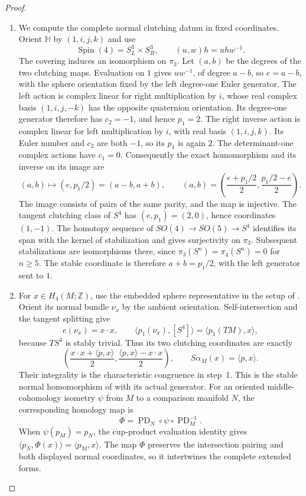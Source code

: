 \begin{proof}
\begin{enumerate}[label=\arabic*.]
\item We compute the complete normal clutching datum in fixed
coordinates. Orient $\mathbb H$ by $(1,i,j,k)$ and use
\[
\operatorname{Spin}(4)=S^3_L\times S^3_R,
\qquad (u,w)h=uhw^{-1}.
\]
The covering induces an isomorphism on $\pi_3$. Let $(a,b)$ be
the degrees of the two clutching maps. Evaluation on $1$ gives
$uw^{-1}$, of degree $a-b$, so $e=a-b$, with the sphere orientation
fixed by the left degree-one Euler generator. The left action is
complex linear for right multiplication by $i$, whose real complex
basis $(1,i,j,-k)$ has the opposite quaternion orientation. Its
degree-one generator therefore has $c_2=-1$, and hence $p_1=2$.
The right inverse action is complex linear for left multiplication
by $i$, with real basis $(1,i,j,k)$. Its Euler number and $c_2$ are
both $-1$, so its $p_1$ is again $2$. The determinant-one complex
actions have $c_1=0$. Consequently the exact homomorphism and its
inverse on its image are
\[
(a,b)\longmapsto(e,p_1/2)=(a-b,a+b),
\qquad
(a,b)=\left(\frac{e+p_1/2}{2},\frac{p_1/2-e}{2}\right).
\]
The image consists of pairs of the same parity, and the map is
injective. The tangent clutching class of $S^4$ has $(e,p_1)=(2,0)$,
hence coordinates $(1,-1)$. The homotopy sequence of
$SO(4)\to SO(5)\to S^4$ identifies its span with the kernel of
stabilization and gives surjectivity on $\pi_3$. Subsequent
stabilizations are isomorphisms there, since
$\pi_3(S^n)=\pi_4(S^n)=0$ for $n\geq5$.
The stable coordinate is therefore $a+b=p_1/2$, with the left
generator sent to $1$.

\item For $x\in H_4(M;\mathbb Z)$, use the embedded sphere
representative in the setup of
\cite[\S3.3, pp.~11--12]{IVVWallForm}. Orient its normal bundle
$\nu_x$ by the ambient orientation. Self-intersection and the
tangent splitting give
\[
e(\nu_x)=x\cdot x,\qquad
\langle p_1(\nu_x),[S^4]\rangle=\langle p_1(TM),x\rangle,
\]
because $TS^4$ is stably trivial. Thus its two clutching coordinates
are exactly
\[
\left(\frac{x\cdot x+\langle p,x\rangle}{2},
      \frac{\langle p,x\rangle-x\cdot x}{2}\right),
\qquad S\alpha_M(x)=\langle p,x\rangle.
\]
Their integrality is the characteristic congruence in step~1.
This is the stable normal homomorphism of
\cite[Definition~3.6, p.~12]{IVVWallForm} with its actual generator.
For an oriented middle-cohomology isometry $\psi$ from $M$ to a
comparison manifold $N$, the corresponding homology map is
\[
\Phi=\operatorname{PD}_N\circ\psi\circ\operatorname{PD}_M^{-1}.
\]
When $\psi(p_M)=p_N$, the cup-product evaluation identity gives
$\langle p_N,\Phi(x)\rangle=\langle p_M,x\rangle$.
The map $\Phi$ preserves the intersection pairing and both displayed
normal coordinates, so it intertwines the complete extended forms.


\end{enumerate}
\end{proof}
